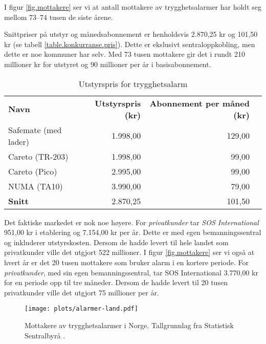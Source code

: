 I figur \vref{fig.mottakere} ser vi at antall mottakere av trygghetsalarmer har
holdt seg mellom 73--74 tusen de siste årene.

Snittpriser på utstyr og månedsabonnement er henholdsvis 2.870,25 kr og 101,50
kr (se tabell \vref{table.konkurranse.pris}). Dette er ekslusivt
sentraloppkobling, men dette er noe kommuner har selv. Med 73 tusen mottakere
gir det i rundt 210 millioner kr for utstyret og 90 millioner per år i
basisabonnement. 

\begin{table}
  \centering
  \begin{tabular}{lrrr}
    \textbf{Navn} &
    \textbf{Utstyrspris (kr)} &
    \textbf{Abonnement per måned (kr)}\\
    Safemate (med lader) & 1.998,00 & 129,00 \\
    Careto (TR-203)      & 1.998,00 &  99,00 \\
    Careto (Pico)        & 2.995,00 &  99,00 \\
    NUMA (TA10)          & 3.990,00 &  79,00 \\
    \textbf{Snitt}       & 2.870,25 & 101,50 \\
  \end{tabular}
  \caption{Utstyrspris for trygghetsalarm}
  \label{table.konkurranse.pris}
\end{table}

Det faktiske markedet er nok noe høyere. For \textit{privatkunder} tar
\textit{SOS International} 951,00 kr i etablering og 7.154,00 kr per år. Dette
er med egen bemanningssentral og inkluderer utstyrskosten. Dersom de hadde
levert til hele landet som privatkunder ville det utgjort 522 millioner.  I
figur \vref{fig.mottakere} ser vi også at hvert år er det 20 tusen mottakere
som bruker alarm i en kortere periode. For \textit{privatkunder}, med sin egen
bemanningssentral, tar SOS International 3.770,00 kr for en periode opp til tre
måneder.  Dersom de hadde levert til 20 tusen privatkunder ville det utgjort 75
millioner per år.

\begin{figure}
  \texttt{[image: plots/alarmer-land.pdf]}
  \caption{Mottakere av trygghetsalarmer i Norge.
    Tallgrunnlag fra Statistisk Sentralbyrå \cite{iplos.2013, ssb.trygghetsalarm}.}
  \label{fig.mottakere}
\end{figure}

